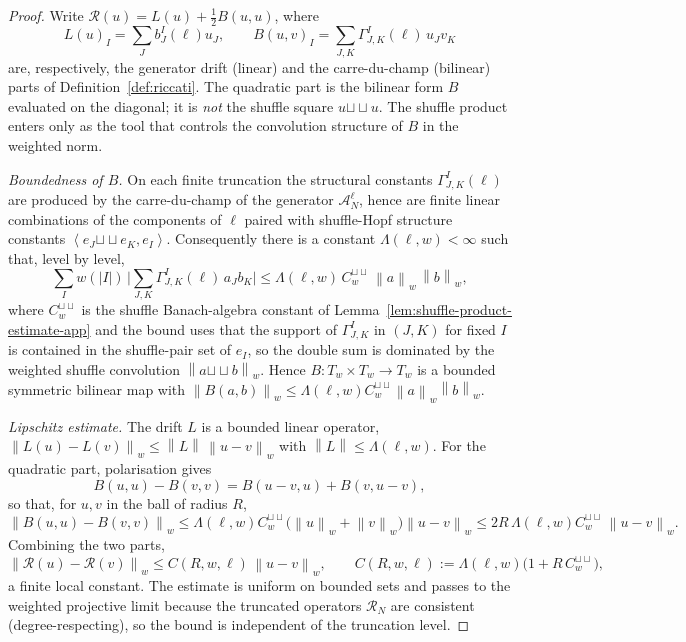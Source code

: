 \documentclass[10pt,a4paper]{amsart}
\newcommand{\Rs}{\mathcal R}
\newcommand{\Tw}{T_w}
\newcommand{\inner}[2]{\left\langle #1,#2\right\rangle}
\newcommand{\norm}[1]{\left\lVert #1\right\rVert}
\newcommand{\sh}{\mathbin{\sqcup\!\sqcup}}
\begin{document}
\begin{proof}
Write $\Rs(u)=L(u)+\tfrac12 B(u,u)$, where
\[
L(u)_I=\sum_J b_J^I(\ell)u_J,
\qquad
B(u,v)_I=\sum_{J,K}\Gamma^I_{J,K}(\ell)\,u_Jv_K
\]
are, respectively, the generator drift (linear) and the carre-du-champ
(bilinear) parts of Definition~\ref{def:riccati}. The quadratic part is
the bilinear form $B$ evaluated on the diagonal; it is \emph{not} the
shuffle square $u\sh u$. The shuffle product enters only as the tool
that controls the convolution structure of $B$ in the weighted norm.

\emph{Boundedness of $B$.} On each finite truncation the structural
constants $\Gamma^I_{J,K}(\ell)$ are produced by the carre-du-champ of
the generator $\mathcal A_N^\ell$, hence are finite linear combinations
of the components of $\ell$ paired with shuffle-Hopf structure
constants $\inner{e_J\sh e_K}{e_I}$. Consequently there is a constant
$\Lambda(\ell,w)<\infty$ such that, level by level,
\[
\sum_I w(|I|)\,\Big|\sum_{J,K}\Gamma^I_{J,K}(\ell)\,a_Jb_K\Big|
\leq \Lambda(\ell,w)\,C_w^{\sh}\,\norm{a}_w\,\norm{b}_w ,
\]
where $C_w^{\sh}$ is the shuffle Banach-algebra constant of
Lemma~\ref{lem:shuffle-product-estimate-app} and the bound uses that
the support of $\Gamma^I_{J,K}$ in $(J,K)$ for fixed $I$ is contained in
the shuffle-pair set of $e_I$, so the double sum is dominated by the
weighted shuffle convolution $\norm{a\sh b}_w$. Hence $B:\Tw\times\Tw\to
\Tw$ is a bounded symmetric bilinear map with
$\norm{B(a,b)}_w\leq \Lambda(\ell,w)C_w^{\sh}\norm{a}_w\norm{b}_w$.

\emph{Lipschitz estimate.} The drift $L$ is a bounded linear operator,
$\norm{L(u)-L(v)}_w\leq \norm{L}\,\norm{u-v}_w$ with
$\norm{L}\leq\Lambda(\ell,w)$. For the quadratic part, polarisation
gives
\[
B(u,u)-B(v,v)=B(u-v,u)+B(v,u-v),
\]
so that, for $u,v$ in the ball of radius $R$,
\[
\norm{B(u,u)-B(v,v)}_w
\leq \Lambda(\ell,w)C_w^{\sh}\big(\norm{u}_w+\norm{v}_w\big)\norm{u-v}_w
\leq 2R\,\Lambda(\ell,w)C_w^{\sh}\,\norm{u-v}_w .
\]
Combining the two parts,
\[
\norm{\Rs(u)-\Rs(v)}_w\leq C(R,w,\ell)\,\norm{u-v}_w,
\qquad
C(R,w,\ell):=\Lambda(\ell,w)\big(1+R\,C_w^{\sh}\big),
\]
a finite local constant. The estimate is uniform on bounded sets and
passes to the weighted projective limit because the truncated operators
$\Rs_N$ are consistent (degree-respecting), so the bound is independent
of the truncation level.
\end{proof}
\end{document}
